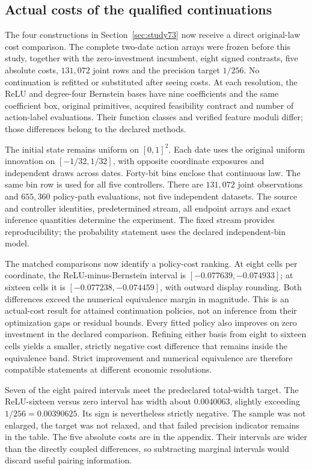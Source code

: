\subsection{Actual costs of the qualified continuations}\label{sec:study74}
The four constructions in Section~\ref{sec:study73} now receive a direct original-law cost comparison. The complete two-date action arrays were frozen before this study, together with the zero-investment incumbent, eight signed contrasts, five absolute costs, $131{,}072$ joint rows and the precision target $1/256$. No continuation is refitted or substituted after seeing costs. At each resolution, the ReLU and degree-four Bernstein bases have nine coefficients and the same coefficient box, original primitives, acquired feasibility contract and number of action-label evaluations. Their function classes and verified feature moduli differ; those differences belong to the declared methods.

The initial state remains uniform on $[0,1]^2$. Each date uses the original uniform innovation on $[-1/32,1/32]$, with opposite coordinate exposures and independent draws across dates. Forty-bit bins enclose that continuous law. The same bin row is used for all five controllers. There are $131{,}072$ joint observations and $655{,}360$ policy-path evaluations, not five independent datasets. The source and controller identities, predetermined stream, all endpoint arrays and exact inference quantities determine the experiment. The fixed stream provides reproducibility; the probability statement uses the declared independent-bin model.



The matched comparisons now identify a policy-cost ranking. At eight cells per coordinate, the ReLU-minus-Bernstein interval is $[-0.077639,-0.074933]$; at sixteen cells it is $[-0.077238,-0.074459]$, with outward display rounding. Both differences exceed the numerical equivalence margin in magnitude. This is an actual-cost result for attained continuation policies, not an inference from their optimization gaps or residual bounds. Every fitted policy also improves on zero investment in the declared comparison. Refining either basis from eight to sixteen cells yields a smaller, strictly negative cost difference that remains inside the equivalence band. Strict improvement and numerical equivalence are therefore compatible statements at different economic resolutions.

Seven of the eight paired intervals meet the predeclared total-width target. The ReLU-sixteen versus zero interval has width about $0.0040063$, slightly exceeding $1/256=0.00390625$. Its sign is nevertheless strictly negative. The sample was not enlarged, the target was not relaxed, and that failed precision indicator remains in the table. The five absolute costs are in the appendix. Their intervals are wider than the directly coupled differences, so subtracting marginal intervals would discard useful pairing information.

